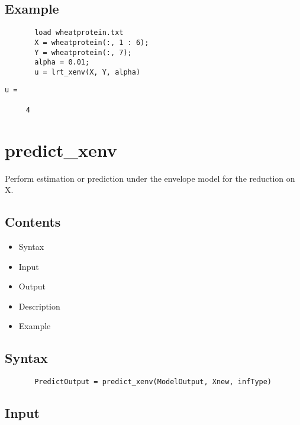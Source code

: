 \documentclass[a4paper,11pt,openany]{memoir}
\begin{document}
\subsection*{Example}


\begin{verbatim}       load wheatprotein.txt
       X = wheatprotein(:, 1 : 6);
       Y = wheatprotein(:, 7);
       alpha = 0.01;
       u = lrt_xenv(X, Y, alpha)\end{verbatim}
    
        \color{lightgray}\ttfamily \begin{verbatim}
u =

     4

\end{verbatim} \rmfamily
\color{black}
    

\newpage

\rmfamily
\color{black}\section{predict\_xenv}

\begin{par}
Perform estimation or prediction under the envelope model for the reduction on X.
\end{par} \vspace{1em}

\subsection*{Contents}

\begin{itemize}
\setlength{\itemsep}{-1ex}
   \item Syntax
   \item Input
   \item Output
   \item Description
   \item Example
\end{itemize}


\subsection*{Syntax}


\begin{verbatim}       PredictOutput = predict_xenv(ModelOutput, Xnew, infType)\end{verbatim}
    

\subsection*{Input}
\end{document}

